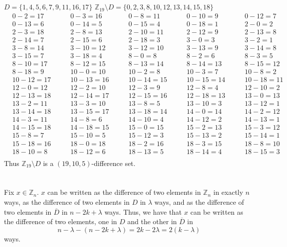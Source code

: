 \documentclass{article}
\begin{document}
\subsection{} %
$D=\{1,4,5,6,7,9,11,16,17\}$
\newline
$\mathbb{Z}_{19}\setminus D=\{0,2,3,8,10,12,13,14,15,18\}$
\begin{align*}
&0-2=17\qquad&0-3=16\qquad&0-8=11\qquad&0-10=9\qquad&0-12=7\qquad\\
&0-13=6\qquad&0-14=5\qquad&0-15=4\qquad&0-18=1\qquad&2-0=2\qquad\\
&2-3=18\qquad&2-8=13\qquad&2-10=11\qquad&2-12=9\qquad&2-13=8\qquad\\
&2-14=7\qquad&2-15=6\qquad&2-18=3\qquad&3-0=3\qquad&3-2=1\qquad\\
&3-8=14\qquad&3-10=12\qquad&3-12=10\qquad&3-13=9\qquad&3-14=8\qquad\\
&3-15=7\qquad&3-18=4\qquad&8-0=8\qquad&8-2=6\qquad&8-3=5\qquad\\
&8-10=17\qquad&8-12=15\qquad&8-13=14\qquad&8-14=13\qquad&8-15=12\qquad\\
&8-18=9\qquad&10-0=10\qquad&10-2=8\qquad&10-3=7\qquad&10-8=2\qquad\\
&10-12=17\qquad&10-13=16\qquad&10-14=15\qquad&10-15=14\qquad&10-18=11\qquad\\
&12-0=12\qquad&12-2=10\qquad&12-3=9\qquad&12-8=4\qquad&12-10=2\qquad\\
&12-13=18\qquad&12-14=17\qquad&12-15=16\qquad&12-18=13\qquad&13-0=13\qquad\\
&13-2=11\qquad&13-3=10\qquad&13-8=5\qquad&13-10=3\qquad&13-12=1\qquad\\
&13-14=18\qquad&13-15=17\qquad&13-18=14\qquad&14-0=14\qquad&14-2=12\qquad\\
&14-3=11\qquad&14-8=6\qquad&14-10=4\qquad&14-12=2\qquad&14-13=1\qquad\\
&14-15=18\qquad&14-18=15\qquad&15-0=15\qquad&15-2=13\qquad&15-3=12\qquad\\
&15-8=7\qquad&15-10=5\qquad&15-12=3\qquad&15-13=2\qquad&15-14=1\qquad\\
&15-18=16\qquad&18-0=18\qquad&18-2=16\qquad&18-3=15\qquad&18-8=10\qquad\\
&18-10=8\qquad&18-12=6\qquad&18-13=5\qquad&18-14=4\qquad&18-15=3\qquad\\
\end{align*}
Thus $\mathbb{Z}_{19}\setminus D$ is a $(19,10,5)$-difference set.
\section{} %
Fix $x\in\mathbb{Z}_n$. $x$ can be written as the difference of two elements in
$\mathbb{Z}_n$ in exactly $n$ ways, as the difference of two elements in $D$ in
$\lambda$ ways, and as the difference of two elements in $\overline{D}$ in
$n-2k+\lambda$ ways. Thus, we have that $x$ can be written as the difference of
two elements, one in $D$ and the other in $\overline{D}$ in
\[n-\lambda-(n-2k+\lambda)=2k-2\lambda=2(k-\lambda)\]
ways.
\end{document}
